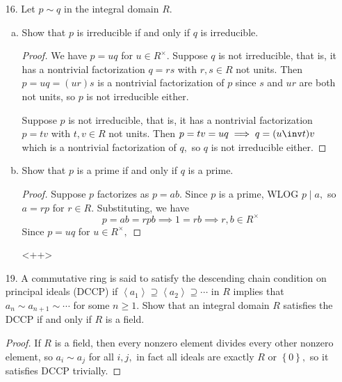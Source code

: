 \documentclass{article}
\begin{document}
\begin{itemize}
\begin{enumerate}[(a)]
\begin{proof}
					To show that $p$ is not prime, use a similar argument to part (a). Since
					\[\left( 1+2\sqrt{-5} \right)\left( 2-\sqrt{-5} \right) = 21 = 3\cdot7\]
					suppose that $p$ divides 3, so that
					\begin{align*}
						3 &= \left( 1+2\sqrt{-5} \right)\left( a+b\sqrt{-5} \right) \\
						&= (a-10b) + (2a+b)\sqrt{-5} \\
						\implies 2a+b &= 0 \implies b=-2a \implies a-10(-2a) = 21a = 3
					\end{align*}
					This has no solution, so $p$ does not divide 3, so it is not prime, as desired.
				\end{proof}
				
		\end{enumerate}

	\item[16.] Let $p\sim q$ in the integral domain $R.$ 

		\begin{enumerate}[(a)]
			\item Show that $p$ is irreducible if and only if $q$ is irreducible.
				\begin{proof}
					We have $p=uq$ for $u\in R^\times.$ Suppose $q$ is not irreducible, that is, it has a nontrivial factorization $q=rs$ with $r, s\in R$ not units. Then $p=uq=(ur)s$ is a nontrivial factorization of $p$ since $s$ and $ur$ are both not units, so $p$ is not irreducible either. 
					
					Suppose $p$ is not irreducible, that is, it has a nontrivial factorization $p=tv$ with $t, v\in R$ not units. Then $p=tv=uq\implies q=(u\inv t)v$ which is a nontrivial factorization of $q,$ so $q$ is not irreducible either.
				\end{proof}

			\item Show that $p$ is a prime if and only if $q$ is a prime.
				\begin{proof}
					Suppose $p$ factorizes as $p=ab.$ Since $p$ is a prime, WLOG $p\mid a,$ so $a=rp$ for $r\in R.$ Substituting, we have
					\[p=ab=rpb\implies 1=rb\implies r, b\in R^\times\]
					Since $p=uq$ for $u\in R^\times,$ 
				\end{proof}<++>

		\end{enumerate}

	\item[19.] A commutative ring is said to satisfy the descending chain condition on principal ideals (DCCP) if $\left< a_1\right>\supseteq\left< a_2\right>\supseteq\cdots$ in $R$ implies that $a_n\sim a_{n+1}\sim\cdots$ for some $n\ge 1.$ Show that an integral domain $R$ satisfies the DCCP if and only if $R$ is a field.
		\begin{proof}
			If $R$ is a field, then every nonzero element divides every other nonzero element, so $a_i\sim a_j$ for all $i, j,$ in fact all ideals are exactly $R$ or $\left\{ 0 \right\},$ so it satisfies DCCP trivially.


\end{proof}
\end{itemize}
\end{document}
